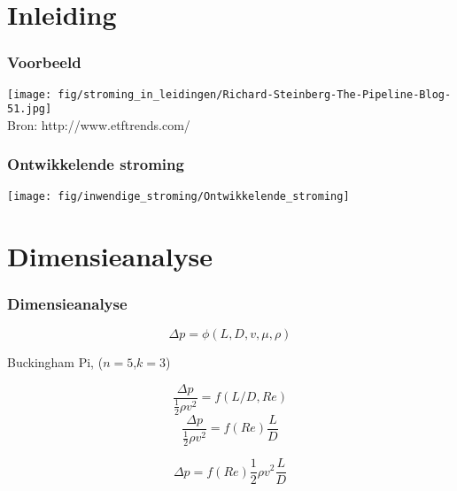 \documentclass[t]{beamer}
\subtitle{Stroming in leidingen}
\begin{document}
	\frame{\titlepage}
	\section{Inleiding}
	\begin{frame}
		\frametitle{Voorbeeld}
		\center
    	\texttt{[image: fig/stroming\_in\_leidingen/Richard-Steinberg-The-Pipeline-Blog-51.jpg]}\\
    	\footnotesize{Bron: http://www.etftrends.com/}
  	\end{frame}
  	\begin{frame}
  		\frametitle{Ontwikkelende stroming}
  		\center
  		\vspace{1.5cm}
  		\texttt{[image: fig/inwendige\_stroming/Ontwikkelende\_stroming]}
  	\end{frame}	
  	\section{Dimensieanalyse}
  	\begin{frame}
		\frametitle{Dimensieanalyse}
		\begin{equation*}
			\Delta p = \phi(L,D,v,\mu,\rho)
		\end{equation*}
		\pause
		
		Buckingham Pi, ($n=5$,$k=3$)
		
		\pause
		\begin{equation*}
			\frac{\Delta p}{\frac{1}{2}\rho v^2} = f(L/D,Re)
		\end{equation*}
		\pause
		\begin{equation*}
			\frac{\Delta p}{\frac{1}{2}\rho v^2} = f(Re) \frac{L}{D}
		\end{equation*}
		\pause
		
		\begin{equation}
			\Delta p = f(Re) \frac{1}{2}\rho v^2 \frac{L}{D}
		\end{equation}
	\end{frame}
\end{document}
